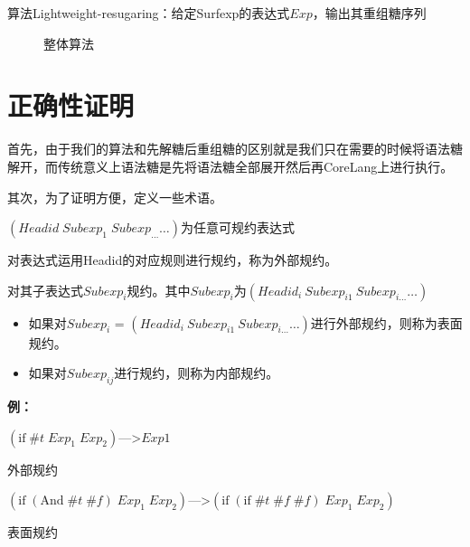 算法Lightweight-resugaring：给定Surfexp的表达式$Exp$，输出其重组糖序列\\
\begin{figure}[h]
	\centering
\caption{整体算法}
\label{fig:lwresugar}
\end{figure}


\section{正确性证明}

首先，由于我们的算法和先解糖后重组糖的区别就是我们只在需要的时候将语法糖解开，而传统意义上语法糖是先将语法糖全部展开然后再CoreLang上进行执行。

其次，为了证明方便，定义一些术语。

$(Headid\;Subexp_{1}\;Subexp_{\ldots} \ldots)$为任意可规约表达式

对表达式运用Headid的对应规则进行规约，称为外部规约。

对其子表达式$Subexp_{i}$规约。其中$Subexp_{i}$为$(Headid_{i}~Subexp_{i1}~Subexp_{i\ldots} \ldots)$
\begin{itemize}
	\item 如果对$Subexp_{i}$ = $(Headid_{i}~Subexp_{i1}~Subexp_{i\ldots} \ldots)$进行外部规约，则称为表面规约。
	\item 如果对$Subexp_{ij}$进行规约，则称为内部规约。
\end{itemize}

{\bfseries 例：}

$(\mbox{if}\; \#t\; Exp_{1}\; Exp_{2})$--->$Exp1$ \begin{flushright}外部规约\end{flushright}

$(\mbox{if}\; (\mbox{And}\; \#t\; \#f)\; Exp_{1}\; Exp_{2})$--->$(\mbox{if}\; (\mbox{if}\; \#t\; \#f\; \#f)\; Exp_{1}\; Exp_{2})$ \begin{flushright}表面规约\end{flushright}


